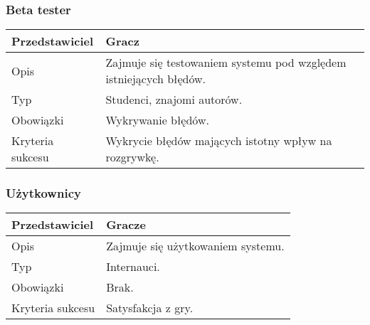 \documentclass[12pt,a4paper,twoside]{article}
\begin{document}
\subsubsection{Beta tester}

\begin{longtable}{|p{1in}|p{4in}|}
\hline
Przedstawiciel &
Gracz\\

\hline
Opis &
Zajmuje się testowaniem systemu pod względem istniejących błędów.\\

\hline
Typ &
Studenci, znajomi autorów.\\

\hline
Obowiązki&
Wykrywanie błędów.\\

\hline
Kryteria sukcesu &
Wykrycie błędów mających istotny wpływ na rozgrywkę.\\

\hline
\end{longtable}

\subsubsection{Użytkownicy}

\begin{longtable}{|p{1in}|p{4in}|}
\hline
Przedstawiciel &
Gracze\\

\hline
Opis &
Zajmuje się użytkowaniem systemu.\\

\hline
Typ &
Internauci.\\

\hline
Obowiązki &
Brak.\\

\hline
Kryteria sukcesu &
Satysfakcja z gry.\\

\hline
\end{longtable}





\end{document}
